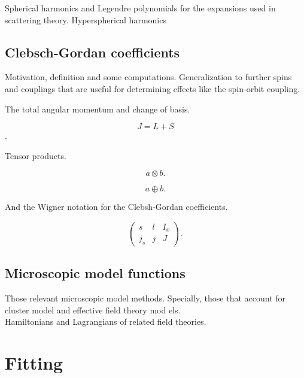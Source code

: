 \documentclass[openany]{book}
\begin{document}
Spherical harmonics and Legendre polynomials for the expansions used in scattering theory.  Hyperspherical harmonics\\

\section{Clebsch-Gordan coefficients} \label{sec:clebschGordan}

Motivation, definition and some computations. Generalization to further spins and couplings that are useful for determining effects like the spin-orbit coupling. 

The total angular momentum and change of basis.

\begin{equation} \label{eq:angularMomentum_definition}
	J = L + S
\end{equation}.

Tensor products.

\begin{equation} \label{eq:angularMomentum_tensorSum}
	a \otimes b.
\end{equation}

\begin{equation} \label{eq:angularMomentum_tensorProduct}
	a \oplus b.
\end{equation}

And the Wigner notation for the Clebsh-Gordan coefficients.

\begin{equation} \label{eq:angularMomentum_wignerCoefficients}
	\left(\begin{array}{ccc}
		s &	l &	I_x \\
		j_s & j & J
	\end{array}\right).
\end{equation}

\section{Microscopic model functions} \label{sec:microscopicalFunctions}

Those relevant microscopic model methods. Specially, those that account for cluster model and effective field theory mod	els. \\

Hamiltonians and Lagrangians of related field theories.

\chapter{Fitting} \label{ap:fitting}
\end{document}
